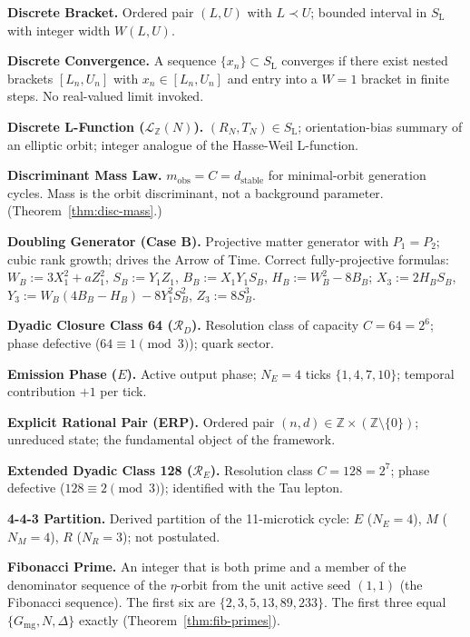 \documentclass[11pt, letterpaper]{article}
\newcommand{\Z}{\mathbb{Z}}
\newcommand{\SL}{S_{\mathrm{L}}}
\newcommand{\aop}{\eta}
\newcommand{\LQ}{\mathcal{L}_{\mathbb{Z}}}
\theoremstyle{definition}
\theoremstyle{plain}
\begin{document}
\medskip\noindent\textbf{Discrete Bracket.}
Ordered pair $(L,U)$ with $L\prec U$; bounded interval in $\SL$ with integer
width $W(L,U)$.

\medskip\noindent\textbf{Discrete Convergence.}
A sequence $\{x_n\}\subset\SL$ converges if there exist nested brackets
$[L_n,U_n]$ with $x_n\in[L_n,U_n]$ and entry into a $W=1$ bracket in finite
steps.  No real-valued limit invoked.

\medskip\noindent\textbf{Discrete L-Function ($\LQ(N)$).}
$(R_N,T_N)\in\SL$; orientation-bias summary of an elliptic orbit; integer
analogue of the Hasse-Weil L-function.

\medskip\noindent\textbf{Discriminant Mass Law.}
$m_{\mathrm{obs}}=C=d_{\mathrm{stable}}$ for minimal-orbit generation cycles.
Mass is the orbit discriminant, not a background parameter.
(Theorem~\ref{thm:disc-mass}.)

\medskip\noindent\textbf{Doubling Generator (Case B).}
Projective matter generator with $P_1=P_2$; cubic rank growth; drives the
Arrow of Time.  Correct fully-projective formulas:
$W_B:=3X_1^2+aZ_1^2$, $S_B:=Y_1Z_1$, $B_B:=X_1Y_1S_B$,
$H_B:=W_B^2-8B_B$; $X_3:=2H_BS_B$, $Y_3:=W_B(4B_B-H_B)-8Y_1^2S_B^2$,
$Z_3:=8S_B^3$.

\medskip\noindent\textbf{Dyadic Closure Class 64 ($\mathcal{R}_D$).}
Resolution class of capacity $C=64=2^6$; phase defective ($64\equiv 1\pmod 3$);
quark sector.

\medskip\noindent\textbf{Emission Phase ($E$).}
Active output phase; $N_E=4$ ticks $\{1,4,7,10\}$; temporal contribution
$+1$ per tick.

\medskip\noindent\textbf{Explicit Rational Pair (ERP).}
Ordered pair $(n,d)\in\Z\times(\Z\setminus\{0\})$; unreduced state; the
fundamental object of the framework.

\medskip\noindent\textbf{Extended Dyadic Class 128 ($\mathcal{R}_E$).}
Resolution class $C=128=2^7$; phase defective ($128\equiv 2\pmod 3$);
identified with the Tau lepton.

\medskip\noindent\textbf{4-4-3 Partition.}
Derived partition of the 11-microtick cycle: $E$ ($N_E=4$), $M$ ($N_M=4$),
$R$ ($N_R=3$); not postulated.

\medskip\noindent\textbf{Fibonacci Prime.}
An integer that is both prime and a member of the denominator sequence of
the $\aop$-orbit from the unit active seed $(1,1)$ (the Fibonacci sequence).
The first six are $\{2,3,5,13,89,233\}$.
The first three equal $\{G_{\mathrm{mg}},N,\Delta\}$ exactly
(Theorem~\ref{thm:fib-primes}).
\end{document}
